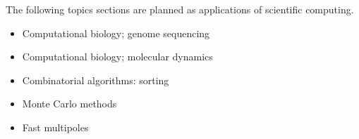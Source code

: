 The following topics sections are planned as applications of scientific
computing.

\begin{itemize}
\item Computational biology; genome sequencing
\item Computational biology; molecular dynamics
\item Combinatorial algorithms: sorting
\item Monte Carlo methods
\item Fast multipoles
\end{itemize}
